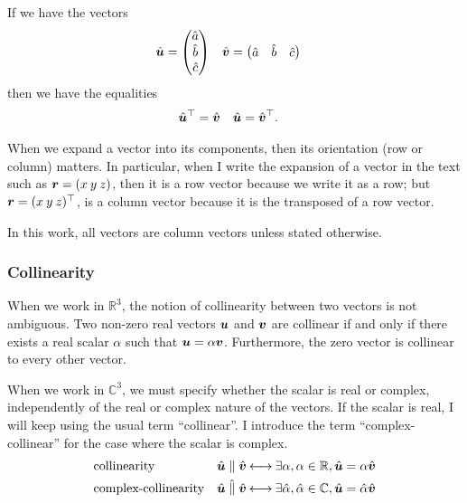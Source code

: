 If we have the vectors
\begin{align}
    \hat{\bm{u}}
    &=
    \begin{pmatrix}
        \hat{a} \\ \hat{b} \\ \hat{c}
    \end{pmatrix}
    &
    \hat{\bm{v}}
    &=
    \begin{pmatrix}
        \hat{a} & \hat{b} & \hat{c}
    \end{pmatrix}
\end{align}
then we have the equalities
\begin{align}
    \hat{\bm{u}}^\top &= \hat{\bm{v}}
    &
    \hat{\bm{u}}        &= \hat{\bm{v}}^\top
    \text{.}
\end{align}

When we expand a vector into its components, then its orientation (row or column) matters.
In particular, when I write the expansion of a vector in the text such as
$\bm{r}= (x \: y \: z)$,
then it is a row vector because we write it as a row;
but
$\bm{r}= (x \: y \: z)^\top$,
is a column vector because it is the transposed of a row vector.

In this work, all vectors are column vectors unless stated otherwise.

\subsubsection{Collinearity}

When we work in $\mathbb{R}^3$, the notion of collinearity between two vectors is not ambiguous.
Two non-zero real vectors $\bm{u}$ and $\bm{v}$ are collinear
if and only if there exists a real scalar $\alpha$
such that $\bm{u} = \alpha \bm{v}$.
Furthermore, the zero vector is collinear to every other vector.

When we work in $\mathbb{C}^3$, we must specify whether the scalar is real or complex, independently of the real or complex nature of the vectors.
If the scalar is real, I will keep using the usual term ``collinear''.
I introduce the term ``complex-collinear'' for the case where the scalar is complex.
\begin{align}
    &\text{collinearity}
    &
    \hat{\bm{u}} \parallel \hat{\bm{v}}
    &\mathbin{\longleftrightarrow}
    \exists \alpha, \alpha \in \mathbb{R}, \hat{\bm{u}} = \alpha \hat{\bm{v}}
    \\
    &\text{complex-collinearity}
    &
    \hat{\bm{u}} \;\hat{\parallel}\; \hat{\bm{v}}
    &\mathbin{\longleftrightarrow}  
    \exists \hat{\alpha}, \hat{\alpha} \in \mathbb{C}, \hat{\bm{u}} = \hat{\alpha} \hat{\bm{v}}
\end{align}

